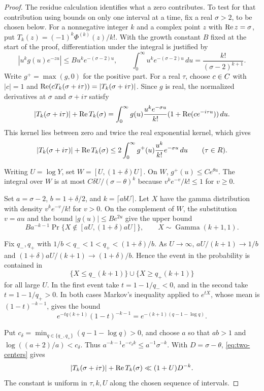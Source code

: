 \begin{proof}
The residue calculation identifies what a zero contributes. To test for that
contribution using bounds on only one interval at a time, fix a real \(\sigma>2\), to
be chosen below. For a nonnegative
integer \(k\) and a complex point \(z\) with \(\operatorname{Re} z=\sigma\),
put \(T_k(z)=(-1)^k\Phi^{(k)}(z)/k!\).
With the growth constant \(B\) fixed at the start of the proof, differentiation
under the integral is justified by
\[
  |u^kg(u)e^{-zu}|\le B u^k e^{-(\sigma-2)u},\qquad
  \int_0^\infty u^k e^{-(\sigma-2)u}\,du
       =\frac{k!}{(\sigma-2)^{k+1}} .
\] Write \(g^+=\max(g,0)\) for the positive part.
For a real \(\tau\), choose \(c\in C\) with \(|c|=1\) and
\(\operatorname{Re}(cT_k(\sigma+i\tau))=|T_k(\sigma+i\tau)|\).
Since \(g\) is real, the normalized derivatives at \(\sigma\) and \(\sigma+i\tau\) satisfy
\[
 |T_k(\sigma+i\tau)|+\operatorname{Re} T_k(\sigma)
  =\int_0^\infty g(u)\frac{u^k e^{-\sigma u}}{k!}
                        (1+\operatorname{Re}(ce^{-i\tau u}))\,du .
\]
This kernel lies between zero and twice the real exponential kernel,
which gives
\begin{equation}\label{eq:two-centers}
 |T_k(\sigma+i\tau)|+\operatorname{Re} T_k(\sigma)
 \leq 2\int_0^\infty g^+(u)\frac{u^k}{k!}e^{-\sigma u}\,du
 \qquad (\tau\in R).
\end{equation}

Writing \(U=\log Y\), set \(W=[U,(1+\delta)U]\).
On \(W\), \(g^+(u)\leq C e^{\theta u}\). The integral over \(W\)
is at most \(C\delta U/(\sigma-\theta)^k\) because
\(v^k e^{-v}/k!\leq 1\) for \(v\geq 0\).

Set \(a=\sigma-2\), \(b=1+\delta/2\), and \(k=\lceil ab U\rceil\).
Let \(X\) have the gamma distribution with density \(v^ke^{-v}/k!\)
for \(v>0\). On the complement of \(W\), the substitution \(v=au\)
and the bound \(|g(u)|\le B e^{2u}\) give the upper bound
\[
 B a^{-k-1}\Pr\{X\notin[aU,(1+\delta)aU]\},
 \qquad X\sim\operatorname{Gamma}(k+1,1).
\]

Fix \(q_-,q_+\) with \(1/b<q_-<1<q_+<(1+\delta)/b\).
As \(U\to\infty\), \(aU/(k+1)\to1/b\) and
\((1+\delta)aU/(k+1)\to(1+\delta)/b\). Hence the event
in the probability is contained in
\[
 \{X\le q_-(k+1)\}\cup\{X\ge q_+(k+1)\}
\]
for all large \(U\). 
In the first event take \(t=1-1/q_-<0\),
and in the second take \(t=1-1/q_+>0\). In both cases
Markov's inequality applied to \(e^{tX}\), whose mean is
\((1-t)^{-k-1}\), gives the bound
\[
 e^{-tq(k+1)}(1-t)^{-k-1}
          =e^{-(k+1)(q-1-\log q)} .
\]

Put \(c_\delta=\min_{q\in\{q_-,q_+\}}(q-1-\log q)>0\), and
choose \(a\) so that \(ab>1\) and \(\log((a+2)/a)<c_\delta\).
Thus \(a^{-k-1}e^{-c_\delta k}\le a^{-1}\sigma^{-k}\).
With \(D=\sigma-\theta\), \eqref{eq:two-centers} gives
\begin{equation}\label{eq:derivative-upper}
 |T_k(\sigma+i\tau)|+\operatorname{Re} T_k(\sigma)
       \ll (1+U)D^{-k}.
\end{equation}
The constant is uniform in \(\tau,k,U\) along the chosen sequence of intervals.


\end{proof}
